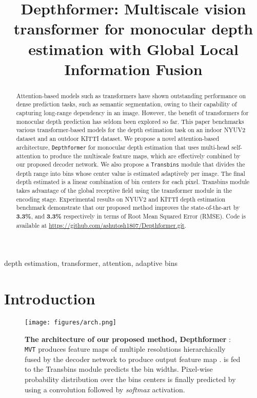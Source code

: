 \documentclass{article}
\title{Depthformer: Multiscale vision transformer for monocular depth estimation with Global Local Information Fusion}
\newcommand{\MVT}{\texttt{MVT}\xspace}
\begin{document}
\maketitle
\begin{abstract}



Attention-based models such as transformers have shown outstanding performance on dense prediction tasks, such as semantic segmentation, owing to their capability of capturing long-range dependency in an image. However, the benefit of transformers for monocular depth prediction has seldom been explored so far. This paper benchmarks various transformer-based models for the depth estimation task on an indoor NYUV2 dataset and an outdoor KITTI dataset. We propose a novel attention-based architecture, \texttt{Depthformer} for monocular depth estimation that uses multi-head self-attention to produce the multiscale feature maps, which are effectively combined by our proposed decoder network. We also propose a \texttt{Transbins} module that divides the depth range into bins whose center value is estimated adaptively per image. The final depth estimated is a linear combination of bin centers for each pixel. Transbins module takes advantage of the global receptive field using the transformer module in the encoding stage. Experimental results on NYUV2 and KITTI depth estimation benchmark demonstrate that our proposed method improves the state-of-the-art by \textbf{3.3\%}, and \textbf{3.3\%} respectively in terms of Root Mean Squared Error (RMSE). Code is available at \href{https://github.com/ashutosh1807/Depthformer.git}{https://github.com/ashutosh1807/Depthformer.git}. \end{abstract}
\begin{keywords}
depth estimation, transformer, attention, adaptive bins
\end{keywords}

\section{Introduction}
\label{sec:intro}
\begin{figure*}[h]
    \centering
    \texttt{[image: figures/arch.png]}
    \caption{\small \textbf{The architecture of our proposed method, Depthformer} : \MVT produces feature maps of multiple resolutions hierarchically fused by the decoder network to produce output feature map .  is fed to the Transbins module predicts the bin widths. Pixel-wise probability distribution over the bins centers is finally predicted by using a  convolution followed by \textit{softmax} activation.  }
    \label{fig:arch}
\end{figure*}
\end{document}
